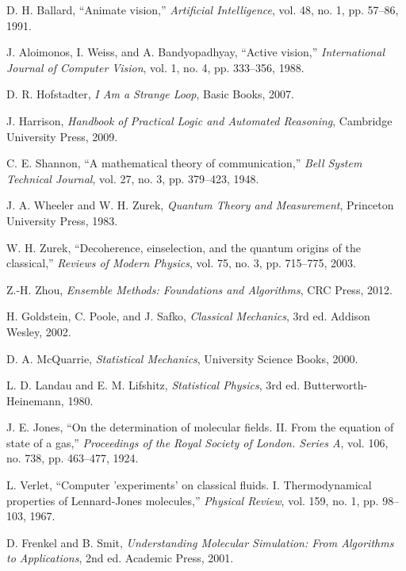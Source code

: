 \documentclass[11pt,a4paper]{article}
\begin{document}
\begin{thebibliography}{99}
D. H. Ballard, ``Animate vision,'' \textit{Artificial Intelligence}, vol. 48, no. 1, pp. 57--86, 1991.

J. Aloimonos, I. Weiss, and A. Bandyopadhyay, ``Active vision,'' \textit{International Journal of Computer Vision}, vol. 1, no. 4, pp. 333--356, 1988.

D. R. Hofstadter, \textit{I Am a Strange Loop}, Basic Books, 2007.

J. Harrison, \textit{Handbook of Practical Logic and Automated Reasoning}, Cambridge University Press, 2009.

C. E. Shannon, ``A mathematical theory of communication,'' \textit{Bell System Technical Journal}, vol. 27, no. 3, pp. 379--423, 1948.

J. A. Wheeler and W. H. Zurek, \textit{Quantum Theory and Measurement}, Princeton University Press, 1983.

W. H. Zurek, ``Decoherence, einselection, and the quantum origins of the classical,'' \textit{Reviews of Modern Physics}, vol. 75, no. 3, pp. 715--775, 2003.

Z.-H. Zhou, \textit{Ensemble Methods: Foundations and Algorithms}, CRC Press, 2012.

H. Goldstein, C. Poole, and J. Safko, \textit{Classical Mechanics}, 3rd ed. Addison Wesley, 2002.

D. A. McQuarrie, \textit{Statistical Mechanics}, University Science Books, 2000.

L. D. Landau and E. M. Lifshitz, \textit{Statistical Physics}, 3rd ed. Butterworth-Heinemann, 1980.

J. E. Jones, ``On the determination of molecular fields. II. From the equation of state of a gas,'' \textit{Proceedings of the Royal Society of London. Series A}, vol. 106, no. 738, pp. 463--477, 1924.

L. Verlet, ``Computer 'experiments' on classical fluids. I. Thermodynamical properties of Lennard-Jones molecules,'' \textit{Physical Review}, vol. 159, no. 1, pp. 98--103, 1967.

D. Frenkel and B. Smit, \textit{Understanding Molecular Simulation: From Algorithms to Applications}, 2nd ed. Academic Press, 2001.


\end{thebibliography}
\end{document}
